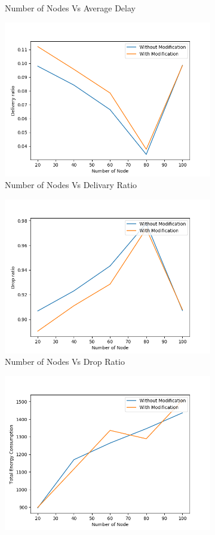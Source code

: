\begin{figure}[h]
\begin{subfigure}{.5\textwidth}
    \caption{Number of Nodes Vs Average Delay}
     \label{node_delay_modified}
\end{subfigure}
\begin{subfigure}{.5\textwidth}
  \centering
  \includegraphics[width=.8\linewidth]{modified_fig/NumberofNodevsDeliveryRatio.png}
     \caption{Number of Nodes Vs Delivary Ratio}
     \label{node_delivery_modified}
\end{subfigure}
\begin{subfigure}{.5\textwidth}
  \centering
  \includegraphics[width=.8\linewidth]{modified_fig/NumberofNodevsDropRatio.png}
     \caption{Number of Nodes Vs Drop Ratio}
     \label{node_drop_modified}
\end{subfigure}
\begin{subfigure}{.5\textwidth}
  \centering
  \includegraphics[width=.8\linewidth]{modified_fig/NumberofNodevsTotalEnergyConsumption.png}

\end{subfigure}
\end{figure}
